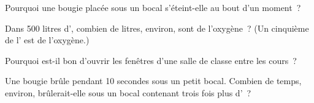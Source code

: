 \begin{exercise}[$\star$]\label{exo:g4:air-a-mixture-of-gases:8}
Pourquoi une bougie placée sous un bocal s'éteint-elle au bout d'un
moment~?
\end{exercise}

\begin{exercise}[$\star$]\label{exo:g4:air-a-mixture-of-gases:9}
Dans 500 litres d', combien de litres, environ, sont de l'oxygène~?
(Un cinquième de l' est de l'oxygène.)
\end{exercise}

\begin{exercise}[$\star\star$]\label{exo:g4:air-a-mixture-of-gases:10}
Pourquoi est-il bon d'ouvrir les fenêtres d'une salle de classe entre
les cours~?
\end{exercise}

\begin{exercise}[$\star\star$]\label{exo:g4:air-a-mixture-of-gases:11}
Une bougie brûle pendant 10 secondes sous un petit bocal. Combien de
temps, environ, brûlerait-elle sous un bocal contenant trois fois plus
d'~?
\end{exercise}

